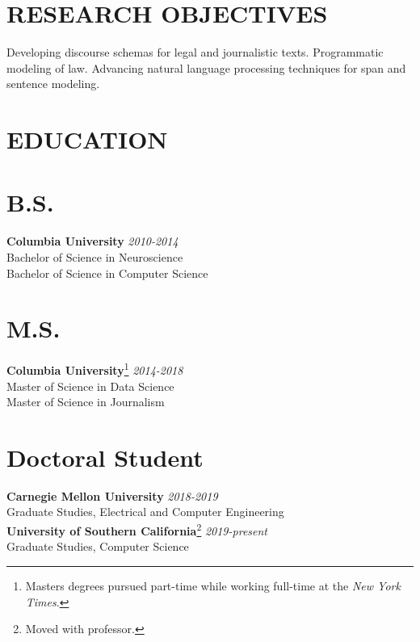 \documentclass[margin]{res}
\newcommand{\fullhrulefill}{%
	\vspace{.7\baselineskip}
	\hspace*{-\sectionwidth}\hrulefill%
}
\begin{document}
\begin{resume}
\section{RESEARCH OBJECTIVES}
Developing discourse schemas for legal and journalistic texts. Programmatic modeling of law. Advancing natural language processing techniques for span and sentence modeling.


\section{EDUCATION}
\fullhrulefill

\section{B.S.}
{\bf Columbia University} \hfill {\sl2010-2014} \\
\-\hspace{.8cm} Bachelor of Science in Neuroscience\\
\-\hspace{.8cm} Bachelor of Science in Computer Science

\section{M.S.}
{\bf Columbia University}\footnote{Masters degrees pursued part-time while working full-time at the \textit{New York Times}.} \hfill {\sl2014-2018}\\
\-\hspace{.8cm} Master of Science in Data Science \\ 
\-\hspace{.8cm} Master of Science in Journalism

\section{Doctoral Student}
{\bf Carnegie Mellon University}  \hfill {\sl 2018-2019}\\
\-\hspace{.8cm} Graduate Studies, Electrical and Computer Engineering \\
{\bf University of Southern California}\footnote{Moved with professor.}  \hfill {\sl 2019-present}\\
\-\hspace{.8cm} Graduate Studies, Computer Science


\end{resume}
\end{document}
